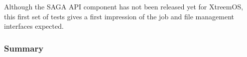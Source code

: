 



Although the SAGA API component
has not been released yet for XtreemOS, this first
set of tests gives a first impression of the job and file management interfaces expected.






\subsubsection{Summary}

